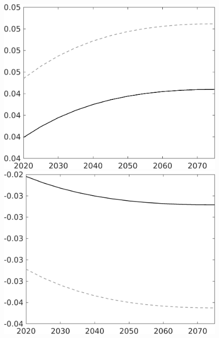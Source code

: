 \documentclass[12pt]{article}
\begin{document}
\begin{figure}[h!!]
\begin{minipage}[]{0.32\textwidth}
	\end{minipage}	
	\begin{minipage}[]{0.32\textwidth}
		\includegraphics[width=1\textwidth]{../../codding_model/own_basedOnFried/optimalPol_010922_revision/figures/all_13Sept22/PerdifNoTauf_regime0_CompTaul_hh_spillover0_nsk0_xgr0_knspil1_sep1_LFlimit0_emsbase0_countec0_GovRev0_etaa0.79_lgd0.png}
	\end{minipage}	
	\begin{minipage}[]{0.32\textwidth}
		\includegraphics[width=1\textwidth]{../../codding_model/own_basedOnFried/optimalPol_010922_revision/figures/all_13Sept22/PerdifNoTauf_regime0_CompTaul_hl_spillover0_nsk0_xgr0_knspil1_sep1_LFlimit0_emsbase0_countec0_GovRev0_etaa0.79_lgd0.png}

\end{minipage}
\end{figure}
\end{document}
